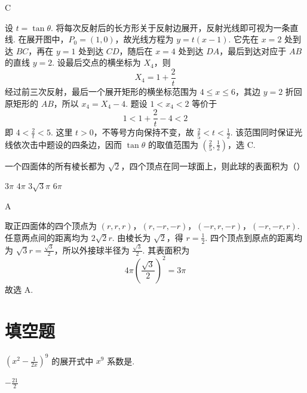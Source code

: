 \begin{answer}
C
\end{answer}

\begin{solution}
设 \(t=\tan\theta\). 将每次反射后的长方形关于反射边展开，反射光线即可视为一条直线. 在展开图中，\(P_{0}=(1,0)\)，故光线方程为 \(y=t(x-1)\). 它先在 \(x=2\) 处到达 \(BC\)，再在 \(y=1\) 处到达 \(CD\)，随后在 \(x=4\) 处到达 \(DA\)，最后到达对应于 \(AB\) 的直线 \(y=2\). 设最后交点的横坐标为 \(X_{4}\)，则
\[
X_{4}=1+\frac2t
\]
经过前三次反射，最后一个展开矩形的横坐标范围为 \(4\leqslant x\leqslant6\)，其边 \(y=2\) 折回原矩形的 \(AB\)，所以 \(x_{4}=X_{4}-4\). 题设 \(1<x_{4}<2\) 等价于
\[
1<1+\frac2t-4<2
\]
即 \(4<\frac2t<5\). 这里 \(t>0\)，不等号方向保持不变，故 \(\frac25<t<\frac12\). 该范围同时保证光线依次击中题设的四条边，因而 \(\tan\theta\) 的取值范围为 \(\left(\frac25,\frac12\right)\)，选 C.
\end{solution}

\begin{problem}
一个四面体的所有棱长都为 \(\sqrt{2}\)，四个顶点在同一球面上，则此球的表面积为（\quad）

\choices
    {\(3\pi\)}
    {\(4\pi\)}
    {\(3\sqrt{3}\pi\)}
    {\(6\pi\)}
\end{problem}

\begin{answer}
A
\end{answer}

\begin{solution}
取正四面体的四个顶点为
\(\left(r,r,r\right)\)，\(\left(r,-r,-r\right)\)，\(\left(-r,r,-r\right)\)，\(\left(-r,-r,r\right)\).
任意两点间的距离均为 \(2\sqrt2r\). 由棱长为 \(\sqrt2\)，得 \(r=\frac12\). 四个顶点到原点的距离均为 \(\sqrt3r=\frac{\sqrt3}{2}\)，所以外接球半径为 \(\frac{\sqrt3}{2}\). 其表面积为
\[
4\pi\left(\frac{\sqrt3}{2}\right)^{2}=3\pi
\]
故选 A.
\end{solution}

\section{填空题}
\begin{problem}
\(\left(x^{2} - \frac{1}{2x}\right)^{9}\) 的展开式中 \(x^{9}\) 系数是\fillinblank{}.
\end{problem}

\begin{answer}
\(-\frac{21}{2}\)
\end{answer}

